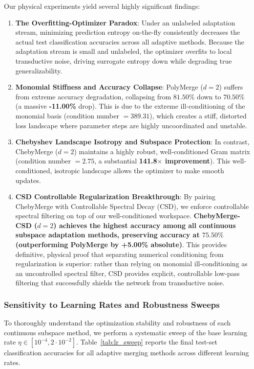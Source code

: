 Our physical experiments yield several highly significant findings:
\begin{enumerate}
    \item \textbf{The Overfitting-Optimizer Paradox}: Under an unlabeled adaptation stream, minimizing prediction entropy on-the-fly consistently decreases the actual test classification accuracies across all adaptive methods. Because the adaptation stream is small and unlabeled, the optimizer overfits to local transductive noise, driving surrogate entropy down while degrading true generalizability. 
    \item \textbf{Monomial Stiffness and Accuracy Collapse}: PolyMerge ($d=2$) suffers from extreme accuracy degradation, collapsing from $81.50\%$ down to $70.50\%$ (a massive \textbf{-11.00\%} drop). This is due to the extreme ill-conditioning of the monomial basis (condition number $= 389.31$), which creates a stiff, distorted loss landscape where parameter steps are highly uncoordinated and unstable.
    \item \textbf{Chebyshev Landscape Isotropy and Subspace Protection}: In contrast, ChebyMerge ($d=2$) maintains a highly robust, well-conditioned Gram matrix (condition number $= 2.75$, a substantial \textbf{141.8$\times$ improvement}). This well-conditioned, isotropic landscape allows the optimizer to make smooth updates.
    \item \textbf{CSD Controllable Regularization Breakthrough}: By pairing ChebyMerge with Controllable Spectral Decay (CSD), we enforce controllable spectral filtering on top of our well-conditioned workspace. \textbf{ChebyMerge-CSD ($d=2$) achieves the highest accuracy among all continuous subspace adaptation methods, preserving accuracy at $75.50\%$ (outperforming PolyMerge by +5.00\% absolute)}. This provides definitive, physical proof that separating numerical conditioning from regularization is superior: rather than relying on monomial ill-conditioning as an uncontrolled spectral filter, CSD provides explicit, controllable low-pass filtering that successfully shields the network from transductive noise.
\end{enumerate}

\subsubsection{Sensitivity to Learning Rates and Robustness Sweeps}
To thoroughly understand the optimization stability and robustness of each continuous subspace method, we perform a systematic sweep of the base learning rate $\eta \in [10^{-4}, 2 \cdot 10^{-2}]$. Table~\ref{tab:lr_sweep} reports the final test-set classification accuracies for all adaptive merging methods across different learning rates.

